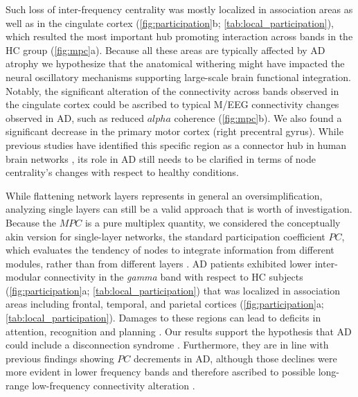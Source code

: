 Such loss of inter-frequency centrality was mostly localized in association areas as well as in the cingulate cortex (\autoref{fig:participation}b; \autoref{tab:local_participation}), which resulted the most important hub promoting interaction across bands in the HC group (\autoref{fig:mpc}a).
Because all these areas are typically affected by AD atrophy \citep{wenk_neuropathologic_2003} we hypothesize that the anatomical withering might have impacted the neural oscillatory mechanisms supporting large-scale brain functional integration. Notably, the significant alteration of the connectivity across bands observed in the cingulate cortex could be ascribed to typical M/EEG connectivity changes observed in AD, such as reduced $alpha$ coherence \citep{stam_magnetoencephalographic_2006,jeong_eeg_2004,dauwels_diagnosis_2010,wang_power_2015} (\autoref{fig:mpc}b).
We also found a significant decrease in the primary motor cortex (right precentral gyrus). While previous studies have identified this specific region as a connector hub in human brain networks \citep{tijms_alzheimers_2013}, its role in AD still needs to be clarified in terms of node centrality's changes with respect to healthy conditions.

While flattening network layers represents in general an oversimplification, analyzing single layers can still be a valid approach that is worth of investigation.
Because the $MPC$ is a pure multiplex quantity, we considered the conceptually akin version for single-layer networks, the standard participation coefficient $PC$, which evaluates the tendency of nodes to integrate information from different modules, rather than from different layers \citep{guimera_cartography_2005, battiston_structural_2014}.
AD patients exhibited lower inter-modular connectivity in the \textit{gamma} band with respect to HC subjects (\autoref{fig:participation}a; \autoref{tab:local_participation}) that was localized in association areas including frontal, temporal, and parietal cortices (\autoref{fig:participation}a; \autoref{tab:local_participation}).
%
Damages to these regions can lead to deficits in attention, recognition and planning \citep{purves_neuroscience_2001}. Our results support the hypothesis that AD could include a disconnection syndrome  \citep{pearson_anatomical_1985,arnold_topographical_1991,catani_rises_2005}.
Furthermore, they are in line with previous findings showing $PC$ decrements in AD, although those declines were more evident in lower frequency bands and therefore ascribed to possible long-range low-frequency connectivity alteration \citep{de_haan_disrupted_2012,tijms_alzheimers_2013}.

